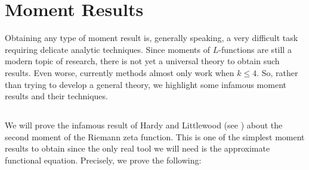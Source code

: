 \chapter{Moment Results}
  Obtaining any type of moment result is, generally speaking, a very difficult task requiring delicate analytic techniques. Since moments of $L$-functions are still a modern topic of research, there is not yet a universal theory to obtain such results. Even worse, currently methods almost only work when $k \le 4$. So, rather than trying to develop a general theory, we highlight some infamous moment results and their techniques.
  \section{}
    We will prove the infamous result of Hardy and Littlewood (see \cite{hardy1916contributions}) about the second moment of the Riemann zeta function. This is one of the simplest moment results to obtain since the only real tool we will need is the approximate functional equation. Precisely, we prove the following:

